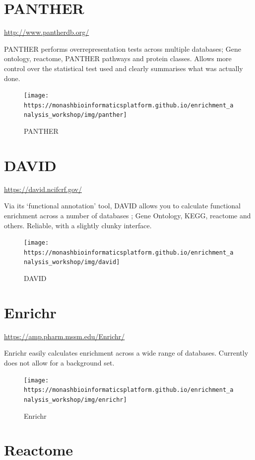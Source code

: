 \documentclass[
]{book}
\begin{document}
\hypertarget{panther}{%
\section{PANTHER}\label{panther}}

\url{http://www.pantherdb.org/}

PANTHER performs overrepresentation tests across multiple databases; Gene ontology, reactome, PANTHER pathways and protein classes. Allows more control over the statistical test used and clearly summarises what was actually done.

\begin{figure}
\texttt{[image: https://monashbioinformaticsplatform.github.io/enrichment\_analysis\_workshop/img/panther]} \caption{PANTHER}\label{fig:unnamed-chunk-38}
\end{figure}

\hypertarget{david}{%
\section{DAVID}\label{david}}

\url{https://david.ncifcrf.gov/}

Via its `functional annotation' tool, DAVID allows you to calculate functional enrichment across a number of databases ; Gene Ontology, KEGG, reactome and others. Reliable, with a slightly clunky interface.

\begin{figure}
\texttt{[image: https://monashbioinformaticsplatform.github.io/enrichment\_analysis\_workshop/img/david]} \caption{DAVID}\label{fig:unnamed-chunk-39}
\end{figure}

\hypertarget{enrichr}{%
\section{Enrichr}\label{enrichr}}

\url{https://amp.pharm.mssm.edu/Enrichr/}

Enrichr easily calculates enrichment across a wide range of databases. Currently does not allow for a background set.

\begin{figure}
\texttt{[image: https://monashbioinformaticsplatform.github.io/enrichment\_analysis\_workshop/img/enrichr]} \caption{Enrichr}\label{fig:unnamed-chunk-40}
\end{figure}

\hypertarget{reactome-1}{%
\section{Reactome}\label{reactome-1}}
\end{document}
